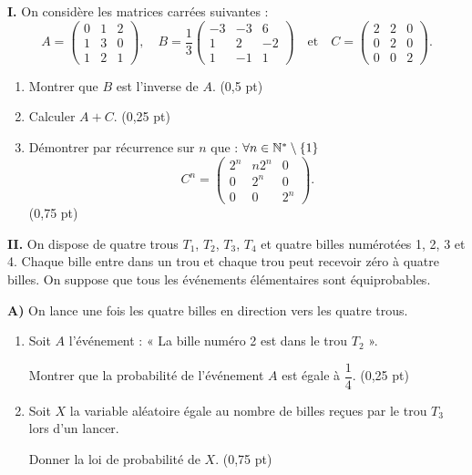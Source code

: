 




\noindent\textbf{I.} On considère les matrices carrées suivantes :
$$
A = \begin{pmatrix} 0 & 1 & 2 \\ 1 & 3 & 0 \\ 1 & 2 & 1 \end{pmatrix}, \quad
B = \frac{1}{3}\begin{pmatrix} -3 & -3 & 6 \\ 1 & 2 & -2 \\ 1 & -1 & 1 \end{pmatrix}
\quad \text{et} \quad
C = \begin{pmatrix} 2 & 2 & 0 \\ 0 & 2 & 0 \\ 0 & 0 & 2 \end{pmatrix}.
$$

\begin{enumerate}
	\item Montrer que $B$ est l'inverse de $A$. \hfill (0,5 pt)
	\item Calculer $A + C$. \hfill (0,25 pt)
	\item Démontrer par récurrence sur $n$ que : $\forall n \in \mathbb{N}^* \setminus \{1\}$
	$$
	C^n = \begin{pmatrix} 2^n & n2^n & 0 \\ 0 & 2^n & 0 \\ 0 & 0 & 2^n \end{pmatrix}.
	$$
	\hfill (0,75 pt)
\end{enumerate}

\bigskip

\noindent\textbf{II.} On dispose de quatre trous $T_1$, $T_2$, $T_3$, $T_4$ et quatre billes numérotées 1, 2, 3 et 4. Chaque bille entre dans un trou et chaque trou peut recevoir zéro à quatre billes. On suppose que tous les événements élémentaires sont équiprobables.

\noindent\textbf{A)} On lance une fois les quatre billes en direction vers les quatre trous.

\begin{enumerate}
	\item Soit $A$ l'événement : « La bille numéro 2 est dans le trou $T_2$ ».

	Montrer que la probabilité de l'événement $A$ est égale à $\dfrac{1}{4}$. \hfill (0,25 pt)
	\item Soit $X$ la variable aléatoire égale au nombre de billes reçues par le trou $T_3$ lors d'un lancer.

	Donner la loi de probabilité de $X$. \hfill (0,75 pt)
\end{enumerate}

